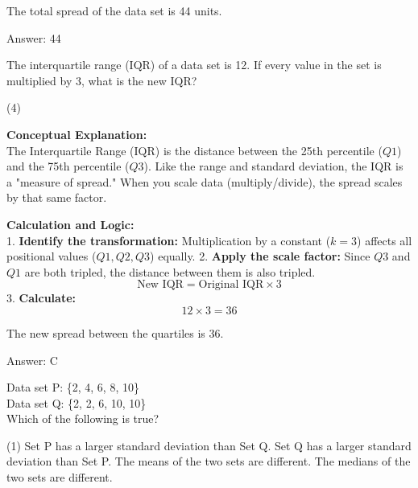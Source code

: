 \documentclass[11pt,paper=a4,answers]{exam}
\begin{document}
\begin{questions}
\begin{solution}
\vspace{20pt}

The total spread of the data set is 44 units.

\vspace{30pt}

Answer: \colorbox{yellow!100}{44}
\end{solution}

\vspace{60pt}

\question
The interquartile range (IQR) of a data set is 12. If every value in the set is multiplied by 3, what is the new IQR?
\begin{tasks}(4)
\end{tasks}

\begin{solution}
\textbf{Conceptual Explanation:} \\
The Interquartile Range (IQR) is the distance between the 25th percentile ($Q1$) and the 75th percentile ($Q3$). Like the range and standard deviation, the IQR is a "measure of spread." When you scale data (multiply/divide), the spread scales by that same factor.

\vspace{30pt}

\textbf{Calculation and Logic:} \\
1. \textbf{Identify the transformation:} Multiplication by a constant ($k = 3$) affects all positional values ($Q1, Q2, Q3$) equally.
2. \textbf{Apply the scale factor:} Since $Q3$ and $Q1$ are both tripled, the distance between them is also tripled.
\[ \text{New IQR} = \text{Original IQR} \times 3 \]
3. \textbf{Calculate:} 
\[ 12 \times 3 = 36 \]

\vspace{20pt}

The new spread between the quartiles is 36.

\vspace{30pt}

Answer: \colorbox{yellow!100}{C}
\end{solution}

\vspace{60pt}

\question
Data set P: \{2, 4, 6, 8, 10\} \\
Data set Q: \{2, 2, 6, 10, 10\} \\
Which of the following is true?
\begin{tasks}(1)
    \task Set P has a larger standard deviation than Set Q.
    \task Set Q has a larger standard deviation than Set P.
    \task The means of the two sets are different.
    \task The medians of the two sets are different.
\end{tasks}


\end{questions}
\end{document}
